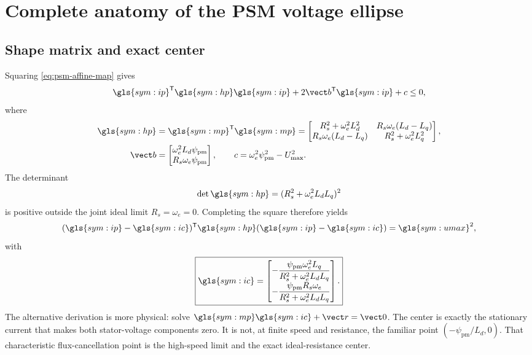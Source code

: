 \section{Complete anatomy of the PSM voltage ellipse}
\label{sec:psm-ellipse}

\subsection{Shape matrix and exact center}

Squaring \cref{eq:psm-affine-map} gives
\begin{equation}
 \gls{sym:ip}^{\mathsf T}\gls{sym:hp}\gls{sym:ip}
 +2\vect b^{\mathsf T}\gls{sym:ip}+c\leq0,
 \end{equation}
where
\begin{align}
 \gls{sym:hp}&=\gls{sym:mp}^{\mathsf T}\gls{sym:mp}
 =\begin{bmatrix}
 R_s^2+\omega_e^2L_d^2&R_s\omega_e(L_d-L_q)\\
 R_s\omega_e(L_d-L_q)&R_s^2+\omega_e^2L_q^2
 \end{bmatrix},\label{eq:psm-Hp}\\
 \vect b&=\begin{bmatrix}\omega_e^2L_d\psi_{\mathrm{pm}}\\
 R_s\omega_e\psi_{\mathrm{pm}}\end{bmatrix},\qquad
 c=\omega_e^2\psi_{\mathrm{pm}}^2-U_{\max}^2.
\end{align}
The determinant
\begin{equation}
 \det\gls{sym:hp}=(R_s^2+\omega_e^2L_dL_q)^2
\end{equation}
is positive outside the joint ideal limit \(R_s=\omega_e=0\). Completing the
square therefore yields
\begin{equation}
 (\gls{sym:ip}-\gls{sym:ic})^{\mathsf T}\gls{sym:hp}
 (\gls{sym:ip}-\gls{sym:ic})=\gls{sym:umax}^2,
 \label{eq:psm-centered-ellipse}
\end{equation}
with
\begin{equation}
 \boxed{\gls{sym:ic}=\begin{bmatrix}
 -\dfrac{\psi_{\mathrm{pm}}\omega_e^2L_q}
 {R_s^2+\omega_e^2L_dL_q}\\[.7em]
 -\dfrac{\psi_{\mathrm{pm}}R_s\omega_e}
 {R_s^2+\omega_e^2L_dL_q}
 \end{bmatrix}.}
 \label{eq:psm-center}
\end{equation}
The alternative derivation is more physical: solve
\(\gls{sym:mp}\gls{sym:ic}+\vect r=\vect0\). The center is exactly the
stationary current that makes both stator-voltage components zero. It is not,
at finite speed and resistance, the familiar point
\((-\psi_{\mathrm{pm}}/L_d,0)\). That characteristic flux-cancellation point
is the high-speed limit and the exact ideal-resistance center.

